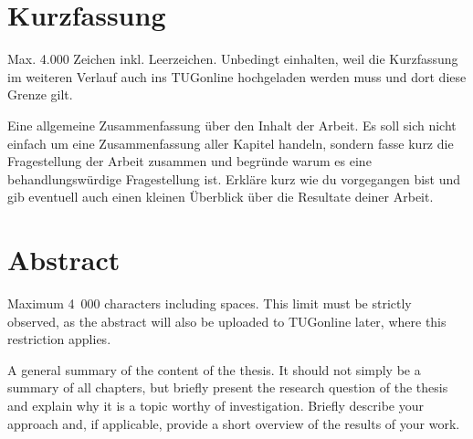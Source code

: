 %
%

\section*{Kurzfassung}

Max. 4.000 Zeichen inkl. Leerzeichen. Unbedingt einhalten, weil die Kurzfassung im weiteren Verlauf auch ins TUGonline hochgeladen werden muss und dort diese Grenze gilt.

Eine allgemeine Zusammenfassung über den Inhalt der Arbeit. Es soll sich nicht einfach um eine Zusammenfassung aller Kapitel handeln, sondern fasse kurz die Fragestellung der Arbeit zusammen und begründe warum es eine behandlungswürdige Fragestellung ist. Erkläre kurz wie du vorgegangen bist und gib eventuell auch einen kleinen Überblick über die Resultate deiner Arbeit.

\newpage

\section*{Abstract}

Maximum 4~000 characters including spaces. This limit must be strictly observed, as the abstract will also be uploaded to TUGonline later, where this restriction applies.

A general summary of the content of the thesis. It should not simply be a summary of all chapters, but briefly present the research question of the thesis and explain why it is a topic worthy of investigation. Briefly describe your approach and, if applicable, provide a short overview of the results of your work.




 
